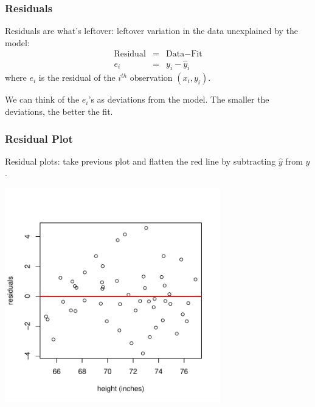 \documentclass[handout]{beamer}
\newcommand{\blue}[1]{\textcolor{blue2}{#1}}
\begin{document}
\begin{frame}
\frametitle{Residuals}
%
%
\blue{Residuals} are what's leftover:  leftover variation in the data unexplained by the model:  
\pause
\begin{eqnarray*}
\mbox{Residual} &=& \mbox{Data} - \mbox{Fit} \\
e_i &=& y_i - \widehat{y}_i
\end{eqnarray*}
where $e_i$ is the \blue{residual} of the $i^{th}$ observation $(x_i, y_i)$.

\vspace{0.5cm}
\pause We can think of the $e_i$'s as \blue{deviations} from the model.  The smaller the deviations, the better the fit.  
\end{frame}


\begin{frame}
\frametitle{Residual Plot}
Residual plots: take previous plot and flatten the red line by subtracting $\widehat{y}$ from $y$.

\begin{center}
\includegraphics[width=0.7\textwidth]{figure/residuals.pdf}
\end{center}

\end{frame}
\end{document}
